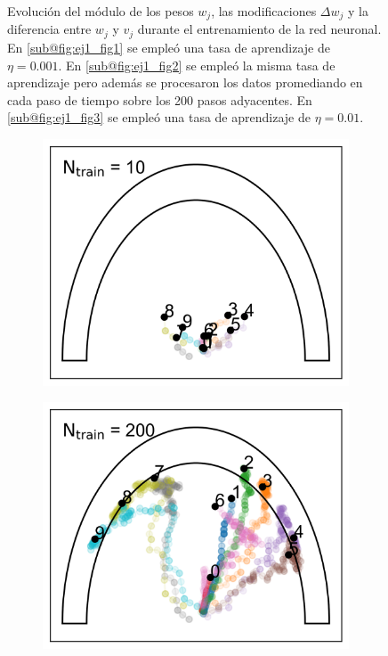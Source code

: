 \documentclass[aps,prb,twocolumn,superscriptaddress,floatfix,longbibliography]{revtex4-2}
\begin{document}
\begin{figure}
\begin{subfigure}[b]{0.3\textwidth}
      \caption{\label{fig:ej1_fig3}}
  \end{subfigure}
     \caption{Evolución del módulo de los pesos $w_j$, las modificaciones $\Delta w_j$ y la diferencia entre $w_j$ y $v_j$ durante el entrenamiento de la red neuronal. En \ref{sub@fig:ej1_fig1} se empleó una tasa de aprendizaje de $\eta = 0.001$. En \ref{sub@fig:ej1_fig2} se empleó la misma tasa de aprendizaje pero además se procesaron los datos promediando en cada paso de tiempo sobre los 200 pasos adyacentes. En \ref{sub@fig:ej1_fig3} se empleó una tasa de aprendizaje de $\eta = 0.01$.}
     \label{fig:three graphs}
\end{figure}

\begin{figure}
  \centering
  \begin{subfigure}[b]{0.24\textwidth}
      \centering
      \includegraphics[width=\textwidth]{ej2_fig1_1.png}
      \caption{\label{fig:ej2_fig1_1}}
  \end{subfigure}
  \hfill
  \begin{subfigure}[b]{0.24\textwidth}
      \centering
      \includegraphics[width=\textwidth]{ej2_fig1_2.png}

\end{subfigure}
\end{figure}
\end{document}
